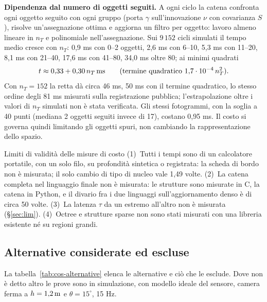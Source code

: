\textbf{Dipendenza dal numero di oggetti seguiti.} A ogni ciclo la catena confronta ogni oggetto seguito con ogni gruppo (porta $\gamma$ sull'innovazione $\nu$ con covarianza $S$), risolve un'assegnazione ottima \cite{kuhn1955} e aggiorna un filtro per oggetto: lavoro almeno lineare in $n_T$ e polinomiale nell'assegnazione. Sui $9\,152$ cicli simulati il tempo medio cresce con $n_T$: 0,9 ms con 0--2 oggetti, 2,6 ms con 6--10, 5,3 ms con 11--20, 8,1 ms con 21--40, 17,6 ms con 41--80, 34,0 ms oltre 80; ai minimi quadrati
\begin{equation}\label{eq:cos-retta}
t\approx 0{,}33+0{,}30\,n_T\,\mathrm{ms}\qquad(\text{termine quadratico } 1{,}7\cdot10^{-4}\,n_T^2).
\end{equation}
Con $n_T=152$ la retta dà circa 46 ms, 50 ms con il termine quadratico, lo stesso ordine degli 81 ms misurati sulla registrazione pubblica; l'estrapolazione oltre i valori di $n_T$ simulati non è stata verificata. Gli stessi fotogrammi, con la soglia a 40 punti (mediana 2 oggetti seguiti invece di 17), costano 0,95 ms. Il costo si governa quindi limitando gli oggetti spuri, non cambiando la rappresentazione dello spazio. 

\begin{riquadro}{Limiti di validità delle misure di costo}
(1)~Tutti i tempi sono di un calcolatore portatile, con un solo filo, su profondità sintetica o registrata: la scheda di bordo non è misurata; il solo cambio di tipo di nucleo vale 1,49 volte. (2)~La catena completa nel linguaggio finale non è misurata: le strutture sono misurate in C, la catena in Python, e il divario fra i due linguaggi sull'aggiornamento denso è di circa 50 volte. (3)~La latenza $\tau$ da un estremo all'altro non è misurata (\S\ref{sec:lim}). (4)~Octree e strutture sparse non sono stati misurati con una libreria esistente né su regioni grandi. 
\end{riquadro}

\subsection{Alternative considerate ed escluse}\label{sec:cos-alternative}

La tabella~\ref{tab:cos-alternative} elenca le alternative e ciò che le esclude. Dove non è detto altro le prove sono in simulazione, con modello ideale del sensore, camera ferma a $h=1{,}2\,\mathrm{m}$ e $\theta=15^\circ$, 15 Hz.

